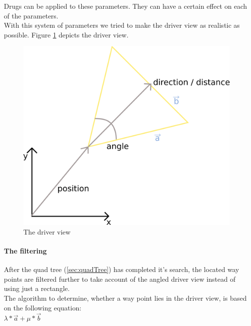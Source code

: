 \noindent Drugs can be applied to these parameters. They can have a certain effect
on each of the parameters. \\

\noindent With this system of parameters we tried to make the driver view as realistic
as possible. Figure \ref{fig:driverView} depicts the driver view.

\begin{figure}[H]
\begin{center}
\includegraphics[scale=0.4]{images/driverview.png}
\end{center}
\caption{The driver view}
\label{fig:driverView}
\end{figure}

\paragraph{The filtering}

After the quad tree (\ref{sec:quadTree}) has completed it's search, the located way
points are filtered further to take account of the angled driver view instead
of using just a rectangle. \\

\noindent The algorithm to determine, whether a way point lies in the driver 
view, is based on the following equation: \\

$
\lambda * \vec{a} + \mu * \vec{b}
$ \\

